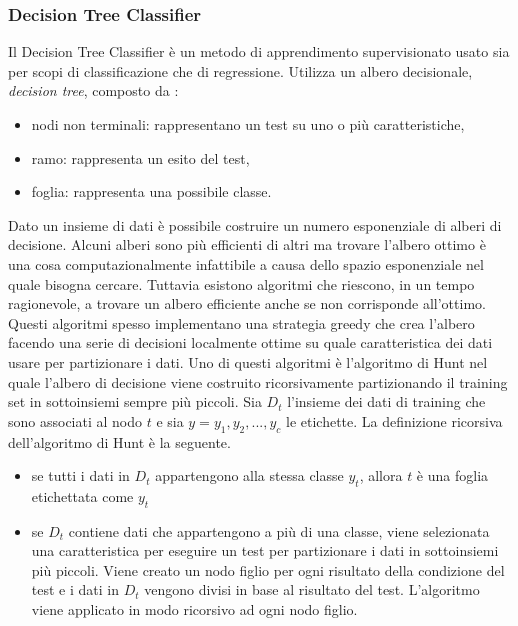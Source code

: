 \documentclass[12pt,italian]{report}
\begin{document}
\subsubsection{Decision Tree Classifier}
Il Decision Tree Classifier è un metodo di apprendimento supervisionato usato sia per scopi di classificazione che di regressione. Utilizza un albero decisionale, \textit{decision tree}, composto da \cite{DataMiningandKnowledgeDiscoveryHandbook}:
\begin{itemize}
	\item nodi non terminali: rappresentano un test su uno o più caratteristiche,
	\item ramo: rappresenta un esito del test,
	\item foglia: rappresenta una possibile classe.
\end{itemize}

Dato un insieme di dati è possibile costruire un numero esponenziale di alberi di decisione. Alcuni alberi sono più efficienti di altri ma trovare l'albero ottimo è una cosa computazionalmente infattibile a causa dello spazio esponenziale nel quale bisogna cercare. Tuttavia esistono algoritmi che riescono, in un tempo ragionevole, a trovare un albero efficiente anche se non corrisponde all'ottimo. Questi algoritmi spesso implementano una strategia greedy che crea l'albero facendo una serie di decisioni localmente ottime su quale caratteristica dei dati usare per partizionare i dati. \cite{Introductiontodatamining}
Uno di questi algoritmi è l'algoritmo di Hunt nel quale l'albero di decisione viene costruito ricorsivamente partizionando il training set in sottoinsiemi sempre più piccoli. Sia $D_t$ l'insieme dei dati di training che sono associati al nodo $t$ e sia $y = {y_1, y_2,...,y_c}$ le etichette. La definizione ricorsiva dell'algoritmo di Hunt è la seguente. \cite{Introductiontodatamining}
\begin{itemize}
	\item se tutti i dati in $D_t$ appartengono alla stessa classe $y_t$, allora $t$ è una foglia etichettata come $y_t$
	\item se $D_t$ contiene dati che appartengono a più di una classe, viene selezionata una caratteristica per eseguire un test per partizionare i dati in sottoinsiemi più piccoli. Viene creato un nodo figlio per ogni risultato della condizione del test e i dati in $D_t$ vengono divisi in base al risultato del test. L'algoritmo viene applicato in modo ricorsivo ad ogni nodo figlio.
\end{itemize}
\end{document}
